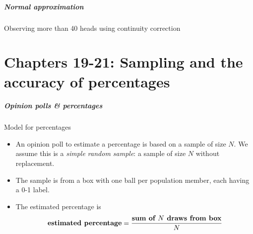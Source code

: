 \documentclass[handout]{beamer}
\begin{document}
   \begin{frame}
   \frametitle{Normal approximation}
   \begin{center}
   \end{center}
   Observing more than 40 heads using continuity correction
   \end{frame}

   \part{Chapters 19-21: Sampling and the accuracy of percentages}
   \frame{\partpage}


   \begin{frame} \frametitle{Opinion polls \& percentages}

   \begin{block}
   {Model for percentages}
   \begin{itemize}
   \item An opinion poll to estimate a percentage
   is based on a sample of size $N$. We assume this is
   a {\em simple random sample}: a sample of size $N$ without replacement.

   \item The sample is from a box with one ball per population member,
   each having a 0-1 label.

   \item The estimated percentage is
   $$
   \text{\bf estimated percentage} = \frac{\text{\bf sum of $N$ draws from box}}{N}
   $$
   \end{itemize}
   \end{block}
   \end{frame}

\end{document}
